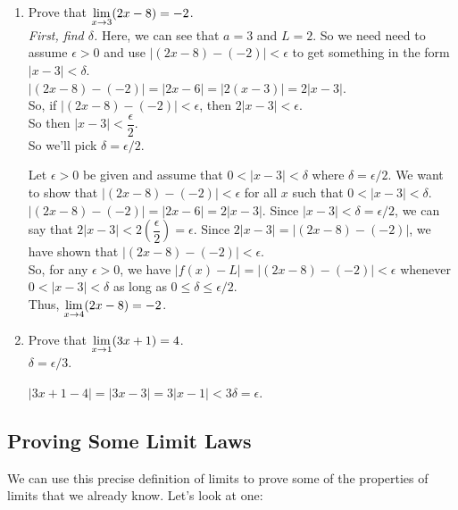 \begin{enumerate}
  \item Prove that $\displaystyle \lim_{x\to3}(2x-8)=-2$.\\

  \textit{First, find $\delta$.} Here, we can see that $a=3$ and $L=2$. So we need need to assume $\epsilon>0$ and use $|(2x-8)-(-2)|<\epsilon$ to get something in the form $|x-3|<\delta$.\\

  $|(2x-8)-(-2)| = |2x-6| = |2(x-3)| = 2|x-3|$.\\
  So, if $|(2x-8)-(-2)|<\epsilon$, then $2|x-3|<\epsilon$.\\
  So then $|x-3|<\dfrac{\epsilon}{2}$.\\
  So we'll pick $\delta=\epsilon/2$.

  \begin{prf}{}
  Let $\epsilon>0$ be given and assume that $0<|x-3|<\delta$ where $\delta=\epsilon/2$. We want to show that $|(2x-8)-(-2)|<\epsilon$ for all $x$ such that $0<|x-3|<\delta$.\\

  $|(2x-8)-(-2)| = |2x-6| = 2|x-3|$. Since $|x-3|<\delta = \epsilon/2$, we can say that $2|x-3|<2\left(\dfrac{\epsilon}{2}\right) = \epsilon$. Since $2|x-3| = |(2x-8)-(-2)|$, we have shown that $|(2x-8)-(-2)|<\epsilon$.\\

  So, for any $\epsilon>0$, we have $|f(x)-L| = |(2x-8)-(-2)|<\epsilon$ whenever $0<|x-3|<\delta$ as long as $0\leq\delta\leq\epsilon/2$.\\
  Thus, $\displaystyle \lim_{x\to 4} (2x-8)=-2$.
  \end{prf}


\item Prove that $\displaystyle \lim_{x\to1}(3x+1)=4$.\\

$\delta = \epsilon/3$.

\begin{prf}{}
$|3x+1-4|=|3x-3|=3|x-1|<3\delta = \epsilon$.
\end{prf}
\end{enumerate}

\subsection*{Proving Some Limit Laws}

We can use this precise definition of limits to prove some of the properties of limits that we already know. Let's look at one:

